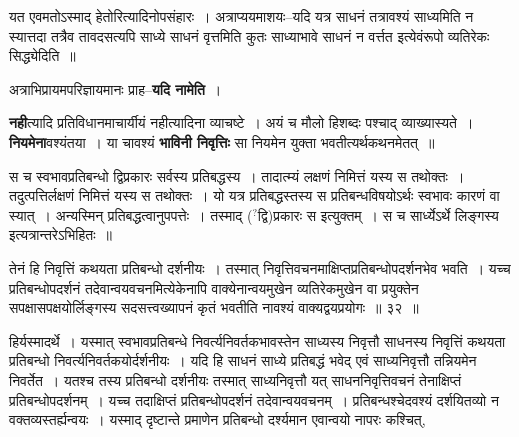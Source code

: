 \documentclass[article,12pt,a4paper]{memoir}
\newcommand{\unclear}[1]{($^{?}$#1)}
\begin{document}
	  \pstart यत एवमतोऽस्माद् हेतोरित्यादिनोपसंहारः । अत्राप्ययमाशयः--यदि यत्र साधनं तत्रावश्यं साध्यमिति न स्यात्तदा तत्रैव तावदसत्यपि साध्ये साधनं वृत्तमिति कुतः साध्याभावे साधनं न वर्त्तत इत्येवंरूपो व्यतिरेकः सिद्ध्येदिति ॥
	\pend
      

	  \pstart अत्राभिप्रायमपरिज्ञायमानः  प्राह--\textbf{यदि नामेति} ।
	\pend
      

	  \pstart \textbf{नही}त्यादि प्रतिविधानमाचार्यीयं नहीत्यादिना व्याचष्टे । अयं च मौलो हिशब्दः पश्चाद् व्याख्यास्यते । \textbf{नियमेना}वश्यंतया । या चावश्यं \textbf{भाविनी निवृत्तिः} सा नियमेन युक्ता भवतीत्यर्थकथनमेतत् ॥
	\pend
	  \bigskip
	  \begingroup
	

	  \pstart स च स्वभावप्रतिबन्धो द्विप्रकारः सर्वस्य प्रतिबद्धस्य । तादात्म्यं लक्षणं निमित्तं यस्य स तथोक्तः । तदुत्पत्तिर्लक्षणं निमित्तं यस्य स तथोक्तः । यो यत्र प्रतिबद्धस्तस्य स प्रतिबन्धविषयोऽर्थः स्वभावः कारणं वा स्यात् । अन्यस्मिन् प्रतिबद्धत्वानुपपत्तेः । तस्माद् \unclear{द्वि}प्रकारः स इत्युक्तम् । स च सार्ध्येऽर्थे लिङ्गस्य इत्यत्रान्तरेऽभिहितः ॥
	\pend
        
	  \bigskip
	  \begingroup
	

	  \pstart तेनं हि निवृत्तिं कथयता प्रतिबन्धो दर्शनीयः । तस्मात् निवृत्तिवचनमाक्षिप्तप्रतिबन्धोपदर्शनभेव भवति । यच्च प्रतिबन्धोपदर्शनं तदेवान्वयवचनमित्येकेनापि वाक्येनान्वयमुखेन व्यतिरेकमुखेन वा प्रयुक्तेन सपक्षासपक्षयोर्लिङ्गस्य सदसत्त्वख्यापनं कृतं भवतीति नावश्यं वाक्यद्वयप्रयोगः ॥ ३२ ॥
	\pend
      
	  \endgroup
	 

	  \pstart {}हिर्यस्मादर्थे । यस्मात् स्वभावप्रतिबन्धे निवर्त्यनिवर्तकभावस्तेन साध्यस्य निवृत्तौ साधनस्य निवृत्तिं कथयता प्रतिबन्धो निवर्त्यनिवर्तकयोर्दर्शनीयः । यदि हि साधनं साध्ये प्रतिबद्धं भवेद् एवं साध्यनिवृत्तौ तन्नियमेन निवर्तेत । यतश्च तस्य प्रतिबन्धो दर्शनीयः तस्मात् साध्यनिवृत्तौ यत् साधननिवृत्तिवचनं तेनाक्षिप्तं प्रतिबन्धोपदर्शनम् । यच्च तदाक्षिप्तं प्रतिबन्धोपदर्शनं तदेवान्वयवचनम् । प्रतिबन्धश्चेदवश्यं दर्शयितव्यो न वक्तव्यस्तर्ह्यन्वयः । यस्माद् दृष्टान्ते प्रमाणेन प्रतिबन्धो दर्श्यमान एवान्वयो नापरः कश्चित्,
	\pend
      
\end{document}
